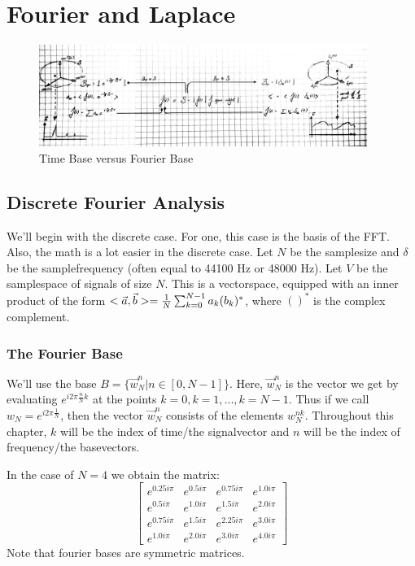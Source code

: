 \section{Fourier and Laplace}

\begin{figure}[H]
  \caption{Time Base versus Fourier Base}
  \centering
    \includegraphics[width=0.95\textwidth]{images/fourier_base.jpg}
\end{figure}


\subsection{Discrete Fourier Analysis}

We'll begin with the discrete case. For one, this case is the basis of the FFT. Also, the math is a lot easier in the discrete case. Let $N$ be the samplesize and $\delta$ be the samplefrequency (often equal to 44100 Hz or 48000 Hz). Let $V$ be the samplespace of signals of size $N$. This is a vectorspace, equipped with an inner product of the form $< \vec{a} , \vec{b} > = \frac{1}{N} \sum_{k=0}^{N-1} a_k (b_k)^*$, where $()^*$ is the complex complement.

\subsubsection{The Fourier Base}




We'll use the base $B = \{ \vec{w}_N^n | n \in [0, N-1]\}$. Here, $\vec{w}_N^n$ is the vector we get by evaluating $e^{i 2\pi \frac{n}{N} k}$ at the points $k=0, k=1, ..., k=N-1$. Thus if we call $w_N = e^{i 2 \pi \frac{1}{N}}$, then the vector $\vec{w}_N^n$ consists of the elements $w_N^{nk}$. Throughout this chapter, $k$ will be the index of time/the signalvector and $n$ will be the index of frequency/the basevectors.

In the case of $N = 4$ we obtain the matrix:
$$ \left[\begin{matrix}e^{0.25 i \pi} & e^{0.5 i \pi} & e^{0.75 i \pi} & e^{1.0 i \pi}\\e^{0.5 i \pi} & e^{1.0 i \pi} & e^{1.5 i \pi} & e^{2.0 i \pi}\\e^{0.75 i \pi} & e^{1.5 i \pi} & e^{2.25 i \pi} & e^{3.0 i \pi}\\e^{1.0 i \pi} & e^{2.0 i \pi} & e^{3.0 i \pi} & e^{4.0 i \pi}\end{matrix}\right] $$
Note that fourier bases are symmetric matrices. 

